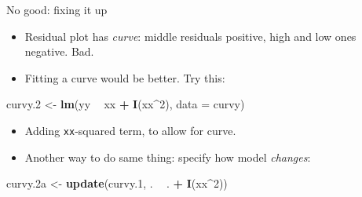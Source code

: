 \documentclass[
  ignorenonframetext,
]{beamer}
\newenvironment{Shaded}{\begin{snugshade}}{\end{snugshade}}
\newcommand{\DataTypeTok}[1]{\textcolor[rgb]{0.13,0.29,0.53}{#1}}
\newcommand{\DecValTok}[1]{\textcolor[rgb]{0.00,0.00,0.81}{#1}}
\newcommand{\FloatTok}[1]{\textcolor[rgb]{0.00,0.00,0.81}{#1}}
\newcommand{\KeywordTok}[1]{\textcolor[rgb]{0.13,0.29,0.53}{\textbf{#1}}}
\newcommand{\NormalTok}[1]{#1}
\newcommand{\OperatorTok}[1]{\textcolor[rgb]{0.81,0.36,0.00}{\textbf{#1}}}
\newcommand{\StringTok}[1]{\textcolor[rgb]{0.31,0.60,0.02}{#1}}
\begin{document}
\begin{frame}[fragile]{No good: fixing it up}
\protect\hypertarget{no-good-fixing-it-up}{}

\begin{itemize}
\item
  Residual plot has \emph{curve}: middle residuals positive, high and
  low ones negative. Bad.
\item
  Fitting a curve would be better. Try this:
\end{itemize}

\begin{Shaded}
\begin{Highlighting}[]
\NormalTok{curvy}\FloatTok{.2}\NormalTok{ <-}\StringTok{ }\KeywordTok{lm}\NormalTok{(yy }\OperatorTok{~}\StringTok{ }\NormalTok{xx }\OperatorTok{+}\StringTok{ }\KeywordTok{I}\NormalTok{(xx}\OperatorTok{^}\DecValTok{2}\NormalTok{), }\DataTypeTok{data =}\NormalTok{ curvy)}
\end{Highlighting}
\end{Shaded}

\begin{itemize}
\item
  Adding \texttt{xx}-squared term, to allow for curve.
\item
  Another way to do same thing: specify how model \emph{changes}:
\end{itemize}

\begin{Shaded}
\begin{Highlighting}[]
\NormalTok{curvy}\FloatTok{.2}\NormalTok{a <-}\StringTok{ }\KeywordTok{update}\NormalTok{(curvy}\FloatTok{.1}\NormalTok{, . }\OperatorTok{~}\StringTok{ }\NormalTok{. }\OperatorTok{+}\StringTok{ }\KeywordTok{I}\NormalTok{(xx}\OperatorTok{^}\DecValTok{2}\NormalTok{))}
\end{Highlighting}
\end{Shaded}

\end{frame}
\end{document}
